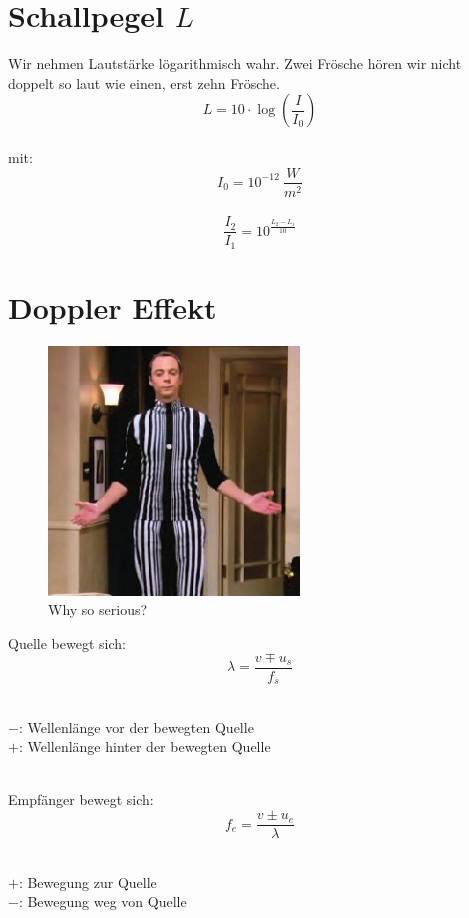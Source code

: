 \section{Schallpegel $L$}
Wir nehmen Lautstärke lögarithmisch wahr. Zwei Frösche hören wir nicht doppelt so laut wie einen, erst zehn Frösche.
\[\boxed{
	L = 10 \cdot \log \left( \frac{I}{I_0} \right)
}\]
\\
mit:
\[
	I_0 = 10^{-12}\ \frac{W}{m^2}
\]
\\
\[\boxed{
	\frac{I_2}{I_1} = 10^{\frac{L_2 - L_1}{10}}
}\]



\section{Doppler Effekt}
\begin{figure}[h!]
	\begin{center}
		\leavevmode
		\includegraphics[scale=0.4]{../fig/dopplereffect.png}
		\caption{Why so serious?}
	\end{center}
\end{figure}
Quelle bewegt sich:
\[
	\lambda = \frac{v\mp u_s}{f_s}
\]\\
\begin{footnotesize}
	$-$: Wellenlänge vor der bewegten Quelle\\
	$+$: Wellenlänge hinter der bewegten Quelle\\
\end{footnotesize}
\\
Empfänger bewegt sich:
\[
	f_e = \frac{v \pm u_e}{\lambda}
\]\\
\begin{footnotesize}
	$+$: Bewegung zur Quelle\\
	$-$: Bewegung weg von Quelle\\
\end{footnotesize}
\\
